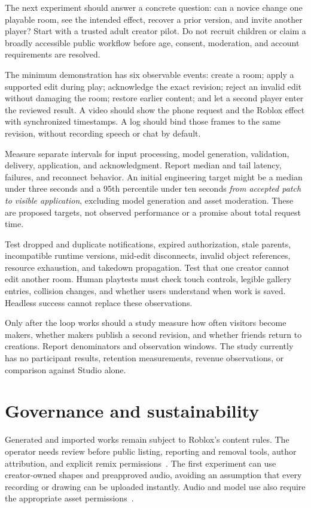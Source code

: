\documentclass[10pt,letterpaper,twocolumn]{article}
\begin{document}
The next experiment should answer a concrete question: can a novice change one playable room, see the intended effect, recover a prior version, and invite another player? Start with a trusted adult creator pilot. Do not recruit children or claim a broadly accessible public workflow before age, consent, moderation, and account requirements are resolved.

The minimum demonstration has six observable events: create a room; apply a supported edit during play; acknowledge the exact revision; reject an invalid edit without damaging the room; restore earlier content; and let a second player enter the reviewed result. A video should show the phone request and the Roblox effect with synchronized timestamps. A log should bind those frames to the same revision, without recording speech or chat by default.

Measure separate intervals for input processing, model generation, validation, delivery, application, and acknowledgment. Report median and tail latency, failures, and reconnect behavior. An initial engineering target might be a median under three seconds and a 95th percentile under ten seconds \emph{from accepted patch to visible application}, excluding model generation and asset moderation. These are proposed targets, not observed performance or a promise about total request time.

Test dropped and duplicate notifications, expired authorization, stale parents, incompatible runtime versions, mid-edit disconnects, invalid object references, resource exhaustion, and takedown propagation. Test that one creator cannot edit another room. Human playtests must check touch controls, legible gallery entries, collision changes, and whether users understand when work is saved. Headless success cannot replace these observations.

Only after the loop works should a study measure how often visitors become makers, whether makers publish a second revision, and whether friends return to creations. Report denominators and observation windows. The study currently has no participant results, retention measurements, revenue observations, or comparison against Studio alone.

\section{Governance and sustainability}
Generated and imported works remain subject to Roblox's content rules. The operator needs review before public listing, reporting and removal tools, author attribution, and explicit remix permissions~\cite{safety}. The first experiment can use creator-owned shapes and preapproved audio, avoiding an assumption that every recording or drawing can be uploaded instantly. Audio and model use also require the appropriate asset permissions~\cite{assets}.
\end{document}
